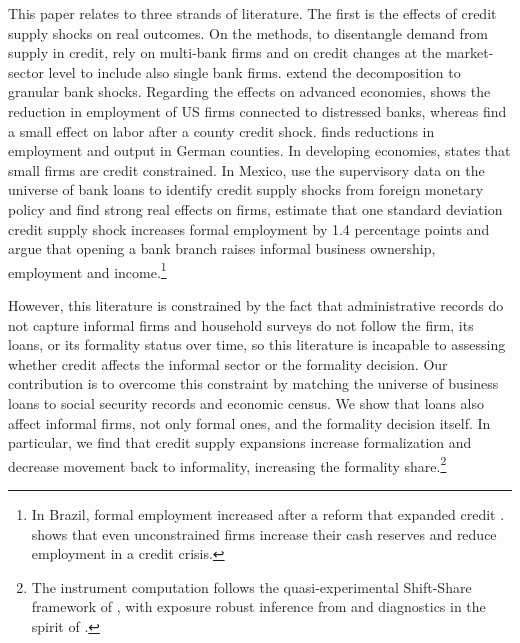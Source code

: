 \documentclass[12pt]{article}
\begin{document}
This paper relates to three strands of literature. The first is the effects of credit supply shocks on real outcomes. On the methods, to disentangle demand from supply in credit, \citet{khwaja2008tracing} rely on multi-bank firms and \citet{degryse2019identifying} on credit changes at the market-sector level to include also single bank firms. \citet{amiti2018much} extend the decomposition to granular bank shocks. Regarding the effects on advanced economies, \citet{chodorow2014employment} shows the reduction in employment of US firms connected to distressed banks, whereas \citet{greenstone2020credit} find a small effect on labor after a county credit shock. \citet{huber2018disentangling} finds reductions in employment and output in German counties. In developing economies, \citet{banerjee2014firms} states that small firms are credit constrained. In Mexico, \citet{morais2019international} use the supervisory data on the universe of bank loans to identify credit supply shocks from foreign monetary policy and find strong real effects on firms, \citet{gutierrez2023credit} estimate that one standard deviation credit supply shock increases formal employment by 1.4 percentage points and \citet{bruhn2014real} argue that opening a bank branch raises informal business ownership, employment and income.\footnote{In Brazil, formal employment increased after a reform that expanded credit \citep{fonseca2022financial}. \citet{melcangi2024precautionary} shows that even unconstrained firms increase their cash reserves and reduce employment in a credit crisis.}  

However, this literature is constrained by the fact that administrative records do not capture informal firms and household surveys do not follow the firm, its loans, or its formality status over time, so this literature is incapable to assessing whether credit affects the informal sector or the formality decision. Our contribution is to overcome this constraint by matching the universe of business loans to social security records and economic census. We show that loans also affect informal firms, not only formal ones, and the formality decision itself. In particular, we find that credit supply expansions increase formalization and decrease movement back to informality, increasing the formality share.\footnote{The instrument computation follows the quasi-experimental Shift-Share framework of \citet{borusyak2022quasi}, with exposure robust inference from \citet{adao2019shiftshare} and diagnostics in the spirit of \citet{goldsmith2020bartik}.}
\end{document}
